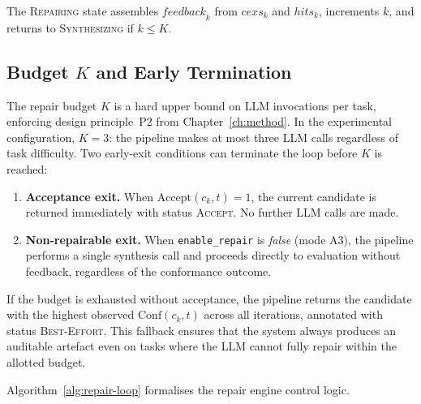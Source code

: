 The \textsc{Repairing} state assembles $\mathit{feedback}_k$ from
$\mathit{cexs}_k$ and $\mathit{hits}_k$, increments $k$, and returns to
\textsc{Synthesizing} if $k \le K$.

\subsection{Budget $K$ and Early Termination}

The repair budget $K$ is a hard upper bound on LLM invocations per task,
enforcing design principle~P2 from Chapter~\ref{ch:method}.  In the
experimental configuration, $K = 3$: the pipeline makes at most three LLM
calls regardless of task difficulty.  Two early-exit conditions can
terminate the loop before $K$ is reached:

\begin{enumerate}
  \item \textbf{Acceptance exit.}  When $\mathrm{Accept}(c_k, t) = 1$,
        the current candidate is returned immediately with status
        \textsc{Accept}.  No further LLM calls are made.
  \item \textbf{Non-repairable exit.}  When \texttt{enable\_repair} is
        \textit{false} (mode A3), the pipeline performs a single synthesis
        call and proceeds directly to evaluation without feedback, regardless
        of the conformance outcome.
\end{enumerate}

If the budget is exhausted without acceptance, the pipeline returns the
candidate with the highest observed $\mathrm{Conf}(c_k, t)$ across all
iterations, annotated with status \textsc{Best-Effort}.  This fallback
ensures that the system always produces an auditable artefact even on tasks
where the LLM cannot fully repair within the allotted budget.

Algorithm~\ref{alg:repair-loop} formalises the repair engine control logic.

